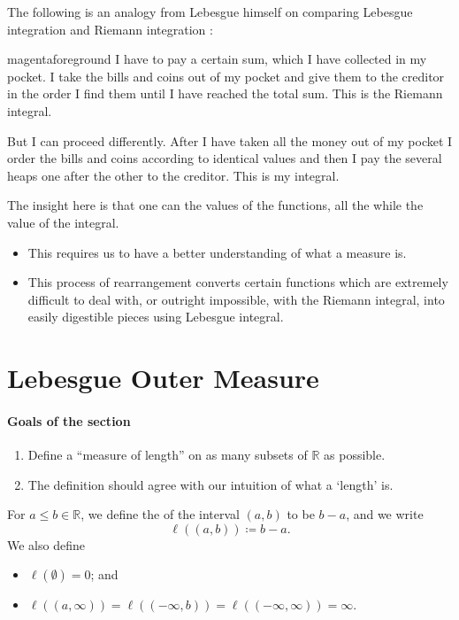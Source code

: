 \documentclass[notoc,notitlepage]{tufte-book}
\begin{document}
The following is an analogy from Lebesgue himself on comparing Lebesgue
integration and Riemann integration \cite{siegmund2008}:

\begin{quotebox}{magenta}{foreground}
  I have to pay a certain sum, which I have collected in my pocket. I take the
  bills and coins out of my pocket and give them to the creditor in the order I
  find them until I have reached the total sum. This is the Riemann integral.

  But I can proceed differently. After I have taken all the money out of my
  pocket I order the bills and coins according to identical values and then I
  pay the several heaps one after the other to the creditor. This is my
  integral.
\end{quotebox}

The insight here is that one can  the values of the
functions, all the while  the value of the integral.
\begin{itemize}
  \item This requires us to have a better understanding of what a measure is.
  \item This process of rearrangement converts certain functions which are
    extremely difficult to deal with, or outright impossible, with the Riemann
    integral, into easily digestible pieces using Lebesgue integral.
\end{itemize}


\section{Lebesgue Outer Measure}%
\label{sec:lebesgue_outer_measure}

\paragraph{Goals of the section}

\begin{enumerate}
  \item Define a ``measure of length'' on as many subsets of $\mathbb{R}$ as
    possible.
  \item The definition should agree with our intuition of what a `length' is.
\end{enumerate}

\begin{defn}[Length]\label{defn:length}
  For $a \leq b \in \mathbb{R}$, we define the  of the interval
  $(a, b)$ to be $b - a$, and we write
  \begin{equation*}
    \ell((a, b)) \coloneqq b - a.
  \end{equation*}
  We also define
  \begin{itemize}
    \item $\ell(\emptyset) = 0$; and
    \item $\ell((a, \infty)) = \ell((-\infty, b)) = \ell((-\infty, \infty)) =
      \infty$.
  \end{itemize}
\end{defn}
\end{document}
